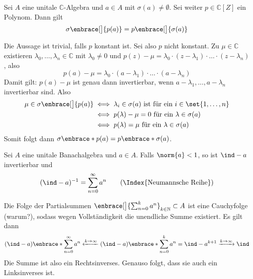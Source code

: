 \begin{satz}[label=satz14_poly,{name=[Verträglichkeit des Spektrums mit Polynomen]}]
	Sei $A$ eine unitale $\mathbb{C}$-Algebra und $a \in A$ mit $\sigma(a)\neq \emptyset$. Sei weiter $p \in \mathbb{C}[Z]$ ein Polynom.
	Dann gilt 
	\[
		\sigma\enbrace[\big]{p(a) }= p \enbrace[\big]{\sigma(a)}
	\]
\end{satz}
\begin{beweis}
	Die Aussage ist trivial, falls $p$ konstant ist. Sei also $p$ nicht konstant. Zu $\mu \in \mathbb{C}$ existieren $\lambda_0, \ldots , \lambda_n \in \mathbb{C}$ mit 
	$\lambda_0 \neq 0$ und $p(z) -\mu = \lambda_0 \cdot (z- \lambda_1) \cdot  \ldots \cdot (z- \lambda_n)$, also
	\[
		p(a) - \mu = \lambda_0 \cdot (a-\lambda_1) \cdot  \ldots \cdot (a- \lambda_n)
	\]
	Damit gilt: $p(a) -\mu$ ist genau dann invertierbar, wenn $a -\lambda_1, \ldots , a-\lambda_n $ invertierbar sind. Also 
	\begin{align}
		\mu \in \sigma \enbrace[\big]{p(a)} &\iff \lambda_i \in \sigma(a) \text{ ist für ein } i \in \set{1,\ldots ,n} \\
		&\iff p(\lambda) -\mu =0 \text{ für ein } \lambda \in \sigma(a) \\
		&\iff p(\lambda)=\mu \text{ für ein } \lambda \in \sigma(a)   
	\end{align}
	Somit folgt dann $\sigma \enbrace*{p(a)} = p \enbrace*{\sigma(a)}$.
\end{beweis}

\begin{satz}[label=satz15_neumann,{name=[Neumannsche Reihe]}]
	Sei $A$ eine unitale Banachalgebra und $a \in A$. Falls $\norm{a}<1$, so ist $\ind-a$ invertierbar und 
	\[
		(\ind-a)^{-1} = \sum_{n=0}^{\infty} a^n \tag*{(\Index{Neumannsche Reihe})}
	\]
\end{satz}
\begin{beweis}
	Die Folge der Partialsummen $\enbrace[\big]{\sum_{n=0}^{k} a^n}_{k \in \mathbb{N}} \subset A$ ist eine Cauchyfolge (warum?), sodass wegen Vollständigkeit die unendliche 
	Summe existiert. Es gilt dann
	\begin{align}
		(\ind-a) \enbrace*{\sum_{n=0}^{\infty} a^n} \xleftarrow{k \to \infty}(\ind-a) \enbrace*{\sum_{n=0}^{k} a^n} = \ind-a^{k+1} \xrightarrow{k \to \infty} \ind
	\end{align}
	Die Summe ist also ein Rechtsinverses. Genauso folgt, dass sie auch ein Linksinverses ist.
\end{beweis}

